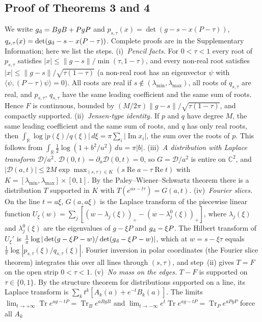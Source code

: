 \documentclass[11pt]{article}
\newcommand{\Tr}{\operatorname{Tr}}
\newcommand{\C}{\mathbb{C}}
\newcommand{\R}{\mathbb{R}}
\renewcommand{\Re}{\operatorname{Re}}
\renewcommand{\Im}{\operatorname{Im}}
\begin{document}
\subsection*{Proof of Theorems 3 and 4}
We write $g_{\rm d}=BgB+PgP$ and $p_{s,\tau}(x)=\det(g-s-x(P-\tau))$, $q_{s,\tau}(x)=\det(g_{\rm d}-s-x(P-\tau))$.
Complete proofs are in the Supplementary Information; here we list the steps.
(i)~\emph{Pencil facts.} For $0<\tau<1$ every root of $p_{s,\tau}$ satisfies $|x|\le\|g-s\|/\min(\tau,1-\tau)$, and
every non-real root satisfies $|x|\le\|g-s\|/\sqrt{\tau(1-\tau)}$ (a non-real root has an eigenvector $\psi$ with
$\langle\psi,(P-\tau)\psi\rangle=0$). All roots are real if $s\notin(\lambda_{\min},\lambda_{\max})$, all roots of
$q_{s,\tau}$ are real, and $p_{s,\tau}$, $q_{s,\tau}$ have the same leading coefficient and the same sum of roots.
Hence $F$ is continuous, bounded by $(M/2\pi)\|g-s\|/\sqrt{\tau(1-\tau)}$, and compactly supported.
(ii)~\emph{Jensen-type identity.} If $p$ and $q$ have degree $M$, the same leading coefficient and the same sum of
roots, and $q$ has only real roots, then $\int_\R\log|p(\xi)/q(\xi)|\,d\xi=\pi\sum_i|\Im x_i|$, the sum over the roots
of $p$. This follows from $\int_\R\frac12\log(1+b^2/u^2)\,du=\pi|b|$.
(iii)~\emph{A distribution with Laplace transform $\mathcal{D}/a^2$.} $\mathcal{D}(0,t)=\partial_a\mathcal{D}(0,t)=0$,
so $G=\mathcal{D}/a^2$ is entire on $\C^2$, and $|\mathcal{D}(a,t)|\le2M\exp\max_{(s,\tau)\in K}(s\Re a-\tau\Re t)$ with
$K=[\lambda_{\min},\lambda_{\max}]\times[0,1]$. By the Paley--Wiener--Schwartz theorem\cite{Hormander1990} there is
a distribution $T$ supported in $K$ with $T(e^{as-t\tau})=G(a,t)$.
(iv)~\emph{Fourier slices.} On the line $t=a\xi$, $G(a,a\xi)$ is the Laplace transform of the piecewise linear function
$U_\xi(w)=\sum_j[(w-\lambda_j(\xi))_+-(w-\lambda^0_j(\xi))_+]$, where $\lambda_j(\xi)$ and $\lambda^0_j(\xi)$ are the
eigenvalues of $g-\xi P$ and $g_{\rm d}-\xi P$. The Hilbert transform of $U_\xi'$ is
$\frac1\pi\log|\det(g-\xi P-w)/\det(g_{\rm d}-\xi P-w)|$, which at $w=s-\xi\tau$ equals
$\frac1\pi\log|p_{s,\tau}(\xi)/q_{s,\tau}(\xi)|$. Fourier inversion in polar coordinates (the Fourier slice
theorem\cite{Natterer1986}) integrates this over all lines through $(s,\tau)$, and step~(ii) gives $T=F$ on the open
strip $0<\tau<1$.
(v)~\emph{No mass on the edges.} $T-F$ is supported on $\tau\in\{0,1\}$. By the structure theorem for distributions
supported on a line, its Laplace transform is $\sum_kt^k[A_k(a)+e^{-t}B_k(a)]$. The limits
$\lim_{t\to+\infty}\Tr e^{ag-tP}=\Tr_Be^{aBgB}$ and $\lim_{t\to-\infty}e^t\Tr e^{ag-tP}=\Tr_Pe^{aPgP}$ force all $A_k$
\end{document}
